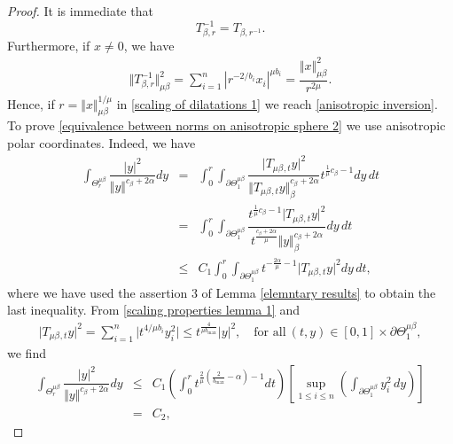 \documentclass[10pt, leqno]{article}
\theoremstyle{definition}
\theoremstyle{remark}
\numberwithin{equation}{section}
\begin{document}
\begin{proof}
It is immediate that
$$
T^{-1}_{\beta,r} = T^{}_{\beta,r^{-1}}.
$$
Furthermore, if $x \neq 0$, we have
\begin{eqnarray}
\label{scaling of dilatations 1}
\Vert T^{-1}_{\beta,r} \Vert^{2}_{\mu \beta} = \sum_{i=1}^{n} \left| r^{-2/b_{i}} x_{i}\right |^{\mu b_{i}} = \dfrac{\Vert x \Vert^{2}_{\mu \beta}}{r^{2\mu}}.
\end{eqnarray}
Hence, if $r = \Vert x \Vert_{\mu \beta}^{1/\mu}$ in \eqref{scaling of dilatations 1} we reach \eqref{anisotropic inversion}. To prove \eqref{equivalence between norms on anisotropic sphere 2} we use anisotropic polar coordinates. Indeed, we have
\begin{eqnarray}
\label{scaling properties lemma 1}
\int_{\Theta^{\mu \beta}_{r}} \dfrac{\vert y \vert^{2}}{\Vert y \Vert^{c_{\beta_{}}+2\alpha}} dy & = &  \nonumber \int_{0}^{r}\int_{\partial \Theta^{\mu \beta}_{1}} \dfrac{\vert T_{\mu \beta_{},t}y \vert^{2}}{\Vert T_{\mu \beta_{},t}y \Vert_{\beta}^{c_{\beta_{}}+2\alpha}} t^{\frac{1}{\mu}c_{\beta} - 1} dy \, dt \\ \nonumber
& = & \nonumber \int_{0}^{r}\int_{\partial \Theta^{\mu \beta}_{1}} \dfrac{t^{\frac{1}{\mu}c_{\beta}-1}\vert T_{\mu \beta_{},t}y \vert^{2}}{t^{\frac{c_{\beta} + 2\alpha}{\mu}}\Vert y \Vert_{\beta}^{c_{\beta_{}}+2\alpha}} dy \, dt \\
& \leq & C_{1} \int_{0}^{r}\int_{\partial \Theta^{\mu \beta}_{1}}t^{-\frac{2\alpha}{\mu} -1}\vert T_{\mu \beta_{},t}y \vert^{2}dy \, dt,
\end{eqnarray}
where we have used the assertion 3 of Lemma \ref{elemntary results} to obtain the last inequality. From \eqref{scaling properties lemma 1} and
\begin{eqnarray}
\vert T_{\mu \beta_{},t}y \vert^{2} = \sum_{i=1}^{n} \vert t^{4/\mu b_{i}}y_{i}^{2} \vert \leq  t^{\frac{4}{\mu b_{\max}}} \vert y \vert^{2}, \quad \text{for all} \ (t, y) \in \left[0,1 \right] \times    \partial \Theta^{\mu \beta}_{1},
\end{eqnarray}
we find
\begin{eqnarray}
\int_{\Theta^{\mu \beta}_{r}} \dfrac{\vert y \vert^{2}}{\Vert y \Vert^{c_{\beta_{}}+2\alpha}} dy & \leq & C_{1} \left(\int_{0}^{r} t^{\frac{2}{\mu}\left( \frac{2}{b_{\max}} - \alpha \right)-1} dt \right)\left[ \sup_{1 \leq i \leq n} \left(\int_{\partial \Theta^{\mu \beta}_{1}} y^{2}_{i}\, dy \right)\right] \\ \nonumber
& = & C_{2},
\end{eqnarray}

\end{proof}
\end{document}
